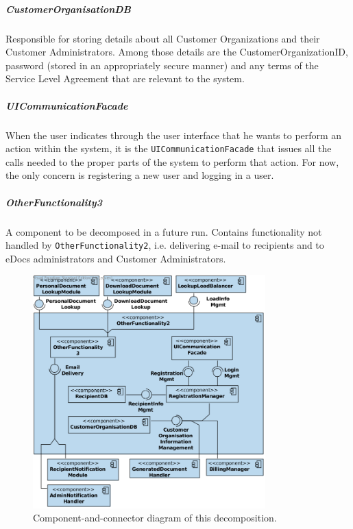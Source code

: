 \documentclass[a4paper,10pt]{article}
\begin{document}
\subparagraph{CustomerOrganisationDB}
Responsible for storing details about all Customer Organizations and their Customer Administrators. Among those details are the CustomerOrganizationID, password (stored in an appropriately secure manner) and any terms of the Service Level Agreement that are relevant to the system.

\subparagraph{UICommunicationFacade}
When the user indicates through the user interface that he wants to perform an action within the system, it is the \texttt{UICommunicationFacade} that issues all the calls needed to the proper parts of the system to perform that action. For now, the only concern is registering a new user and logging in a user.

\subparagraph{OtherFunctionality3}
A component to be decomposed in a future run. Contains functionality not handled by \texttt{OtherFunctionality2}, i.e. delivering e-mail to recipients and to eDocs administrators and Customer Administrators.

\begin{figure}[!htp]
    \centering
    \includegraphics[width=0.8\textwidth]{comp_diag_3.png}
    \caption{Component-and-connector diagram of this decomposition.
        }\label{fig:it3-cc_main}
\end{figure}

\end{document}
